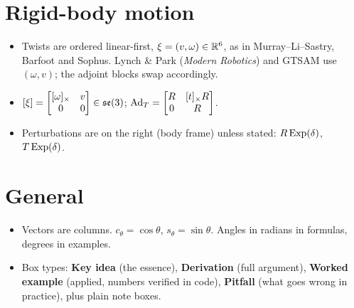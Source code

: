\documentclass[../notes.tex]{subfiles}
\begin{document}
\section*{Rigid-body motion}
\begin{itemize}
\item Twists are ordered linear-first, $\xi=(v,\omega)\in\mathbb{R}^6$, as in Murray--Li--Sastry, Barfoot and Sophus. Lynch \& Park (\emph{Modern Robotics}) and GTSAM use $(\omega,v)$; the adjoint blocks swap accordingly.
\item $[\xi]=\begin{bmatrix}[\omega]_{\times}&v\\0&0\end{bmatrix}\in\mathfrak{se}(3)$; $\operatorname{Ad}_T=\begin{bmatrix}R&[t]_{\times}R\\0&R\end{bmatrix}$.
\item Perturbations are on the right (body frame) unless stated: $R\operatorname{Exp}(\delta)$, $T\operatorname{Exp}(\delta)$.
\end{itemize}

\section*{General}
\begin{itemize}
\item Vectors are columns. $c_\theta=\cos\theta$, $s_\theta=\sin\theta$. Angles in radians in formulas, degrees in examples.
\item Box types: \textbf{Key idea} (the essence), \textbf{Derivation} (full argument), \textbf{Worked example} (applied, numbers verified in code), \textbf{Pitfall} (what goes wrong in practice), plus plain note boxes.
\end{itemize}
\end{document}
